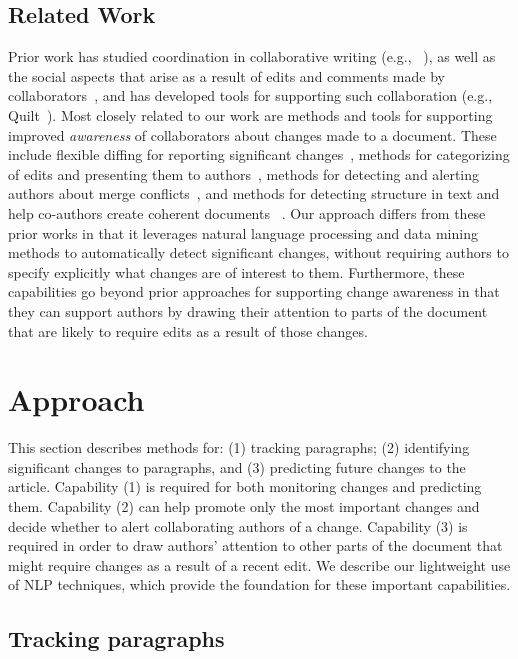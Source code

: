 \subsection{Related Work}\label{related-work}

Prior work has studied coordination in collaborative writing (e.g.,
~\cite{neuwirth2001computer,kittur2007he}), as well as the social
aspects that arise as a result of edits and comments made by
collaborators~\cite{birnholtz2013write}, and has developed tools for
supporting such collaboration (e.g., Quilt~\cite{fish1988quilt}). Most
closely related to our work are methods and tools for supporting
improved \emph{awareness} of collaborators about changes made to a
document. These include flexible diffing for reporting significant
changes~\cite{neuwirth1992flexible}, methods for categorizing of edits
and presenting them to
authors~\cite{fong2010did,papadopoulou2007structured,tam2006framework},
methods for detecting and alerting authors about merge
conflicts~\cite{hainsworth2006enabling}, and methods for detecting
structure in text and help co-authors create coherent documents~
\cite{de2007narrative}. Our approach differs from these prior works in
that it leverages natural language processing and data mining methods to
automatically detect significant changes, without requiring authors to
specify explicitly what changes are of interest to them. Furthermore,
these capabilities go beyond prior approaches for supporting change
awareness in that they can support authors by drawing their attention to
parts of the document that are likely to require edits as a result of
those changes.

\section{Approach}\label{approach}

This section describes methods for: (1) tracking paragraphs; (2)
identifying significant changes to paragraphs, and (3) predicting future
changes to the article. Capability (1) is required for both monitoring
changes and predicting them. Capability (2) can help promote only the
most important changes and decide whether to alert collaborating authors
of a change. Capability (3) is required in order to draw authors'
attention to other parts of the document that might require changes as a
result of a recent edit. We describe our lightweight use of NLP
techniques, which provide the foundation for these important
capabilities.

\subsection{Tracking paragraphs}\label{tracking-paragraphs}

